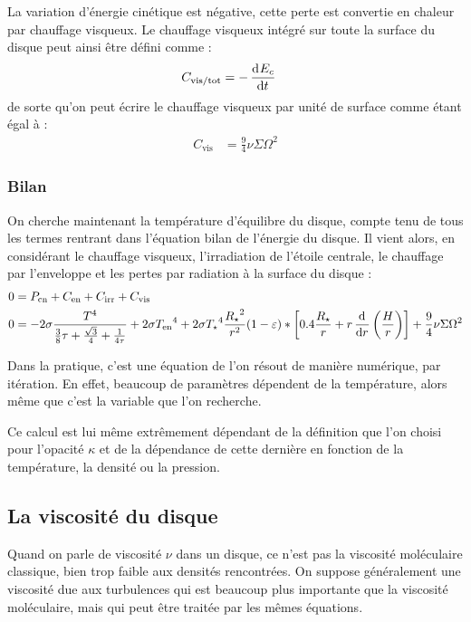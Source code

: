 La variation d'énergie cinétique est négative, cette perte est convertie en chaleur par chauffage visqueux. Le chauffage visqueux intégré sur toute la surface du disque peut ainsi être défini comme : 
\begin{align*}
C_\text{vis/tot} &= - \mathinner{ \dfrac{\operatorname{d \!}{^{}}E_c}{\operatorname{d \!}{{t}^{}}} }
\end{align*}
de sorte qu'on peut écrire le chauffage visqueux par unité de surface comme étant égal à :
\begin{align}
C_\text{vis} &= \frac{9}{4} \nu\Sigma\Omega^2
\end{align}

\subsubsection{Bilan}
On cherche maintenant la température d'équilibre du disque, compte tenu de tous les termes rentrant dans l'équation bilan de l'énergie du disque. Il vient alors, en considérant le chauffage visqueux, l'irradiation de l'étoile centrale, le chauffage par l'enveloppe et les pertes par radiation à la surface du disque : 
\begin{align}
0 &= P_\text{cn} + C_\text{en} + C_\text{irr} + C_\text{vis}\nonumber\\
0 &= - 2\sigma \frac{T^4}{\frac{3}{8}\tau + \frac{\sqrt{3}}{4} + \inv{4\tau}} + 2 \sigma {T_\text{en}}^4 + 2 \sigma {T_\star}^4 \frac{{R_\star}^2}{r^2} (1-\varepsilon) * \left[0.4 \frac{R_\star}{r} + r \dod{}{r}\left(\frac{H}{r}\right)\right] + \frac{9}{4} \nu\Sigma\Omega^2
\end{align}

Dans la pratique, c'est une équation de l'on résout de manière numérique, par itération. En effet, beaucoup de paramètres dépendent de la température, alors même que c'est la variable que l'on recherche. 

Ce calcul est lui même extrêmement dépendant de la définition que l'on choisi pour l'opacité $\kappa$ et de la dépendance de cette dernière en fonction de la température, la densité ou la pression. 

\subsection{La viscosité du disque}\label{sec:viscosite}%
Quand on parle de viscosité $\nu$ dans un disque, ce n'est pas la viscosité moléculaire classique, bien trop faible aux densités rencontrées. On suppose généralement une viscosité due aux turbulences qui est beaucoup plus importante que la viscosité moléculaire, mais qui peut être traitée par les mêmes équations. 

